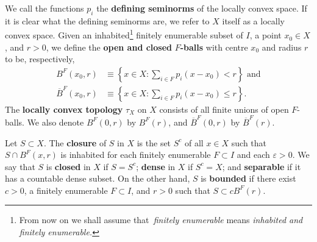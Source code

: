\documentclass{article}%
\begin{document}
%

\noindent
We call the functions $p_{i}$ the \textbf{defining seminorms} of the locally
convex space. If it is clear what the defining seminorms are, we refer to $X$
itself as a locally convex space. Given an inhabited\footnote{%
\normalfont\sf
From now on we shall assume that\emph{\ finitely enumerable} means
\emph{inhabited and finitely enumerable.}} finitely enumerable subset of $I$,
a point $x_{0}\in X$, and $r>0$, we define the \textbf{open and closed }%
$F$\textbf{-balls} with centre $x_{0}$ and radius $r$ to be, respectively,%
\begin{align*}
B^{F}(x_{0},r)  &  \equiv\left\{  x\in X:\sum_{i\in F}p_{i}(x-x_{0}%
)<r\right\}  \text{ and}\\
\overline{B}^{F}(x_{0},r)  &  \equiv\left\{  x\in X:\sum_{i\in F}p_{i}%
(x-x_{0})\leq r\right\}  .
\end{align*}
The \textbf{locally convex topology} $\tau_{X}$ on $X$ consists of all finite
unions of open $F$-balls. We also denote $B^{F}(0,r)$ by $B^{F}(r)$, and
$\overline{B}^{F}(0,r)$ by $\overline{B}^{F}(r)$.

Let $S\subset X$. The \textbf{closure }of $S$ in $X$ is the set $S^{c}$ of all
$x\in X$ such that $S\cap B^{F}(x,r)$ is inhabited for each finitely
enumerable $F\subset I$ and each $\varepsilon>0$. We say that $S$ is
\textbf{closed }in $X$ if $S=S^{c}$; \textbf{dense }in $X$ if $S^{c}=X$; and
\textbf{separable} if it has a countable dense subset. On the other hand, $S$
is \textbf{bounded} if there exist $c>0$, a finitely enumerable $F\subset I$,
and $r>0$ such that $S\subset cB^{F}(r)$.
\end{document}

